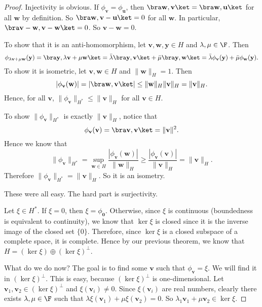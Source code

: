 \documentclass[a4paper]{article}
\begin{document}
\begin{proof}
  Injectivity is obvious. If $\phi_{\mathbf{v}} = \phi_{\mathbf{u}}$, then $\bra \mathbf{w}, \mathbf{v}\ket = \bra \mathbf{w}, \mathbf{u}\ket$ for all $\mathbf{w}$ by definition. So $\bra \mathbf{w}, \mathbf{v} - \mathbf{u}\ket = 0$ for all $\mathbf{w}$. In particular, $\bra \mathbf{v} - \mathbf{w}, \mathbf{v} - \mathbf{w}\ket = 0$. So $\mathbf{v} - \mathbf{w} = 0$.

  To show that it is an anti-homomorphism, let $\mathbf{v}, \mathbf{w}, \mathbf{y} \in H$ and $\lambda, \mu \in \F$. Then
  \[
    \phi_{\lambda\mathbf{v} + \mu \mathbf{w}}(\mathbf{y}) = \bra \mathbf{y}, \lambda \mathbf{v} + \mu \mathbf{w}\ket = \bar{\lambda} \bra \mathbf{y}, \mathbf{v}\ket + \bar{\mu}\bra \mathbf{y}, \mathbf{w}\ket = \bar{\lambda} \phi_{\mathbf{v}}(\mathbf{y}) + \bar{\mu} \phi_{\mathbf{w}} (\mathbf{y}).
  \]
  To show it is isometric, let $\mathbf{v}, \mathbf{w} \in H$ and $\|\mathbf{w}\|_H = 1$. Then
  \[
    |\phi_\mathbf{v}(\mathbf{w})| = |\bra \mathbf{w}, \mathbf{v}\ket| \leq \|\mathbf{w}\|_H \|\mathbf{v}\|_H = \|\mathbf{v}\|_H.
  \]
  Hence, for all $\mathbf{v}$, $\|\phi_\mathbf{v}\|_{H^*} \leq \|\mathbf{v}\|_H$ for all $\mathbf{v} \in H$.

  To show $\|\phi_\mathbf{v}\|_{H^*}$ is exactly $\|\mathbf{v}\|_H$, notice that
  \[
    \phi_\mathbf{v}(\mathbf{v}) = \bra \mathbf{v}, \mathbf{v}\ket = \|\mathbf{v}\|^2.
  \]
  Hence we know that
  \[
    \|\phi_\mathbf{v}\|_{H^*} = \sup_{\mathbf{w} \in H} \frac{|\phi_{\mathbf{v}}(\mathbf{w})|}{\|\mathbf{w}\|_H} \geq \frac{|\phi_{\mathbf{v}}(\mathbf{v})|}{\|\mathbf{v}\|_H} = \|\mathbf{v}\|_H.
  \]
  Therefore $\|\phi_{\mathbf{v}}\|_{H^*} = \|\mathbf{v}\|_H$. So it is an isometry.

  These were all easy. The hard part is surjectivity.

  Let $\xi \in H^*$. If $\xi = 0$, then $\xi = \phi_{\mathbf{0}}$. Otherwise, since $\xi$ is continuous (boundedness is equivalent to continuity), we know that $\ker \xi$ is closed since it is the inverse image of the closed set $\{0\}$. Therefore, since $\ker \xi$ is a closed subspace of a complete space, it is complete. Hence by our previous theorem, we know that $H = (\ker \xi) \oplus (\ker \xi)^\perp$.

  What do we do now? The goal is to find some $\mathbf{v}$ such that $\phi_{\mathbf{v}} = \xi$. We will find it in $(\ker \xi)^\perp$. This is easy, because $(\ker \xi)^\perp$ is one-dimensional. Let $\mathbf{v}_1, \mathbf{v}_2 \in (\ker \xi)^\perp$ and $\xi(\mathbf{v}_i) \not= 0$. Since $\xi(\mathbf{v}_i)$ are real numbers, clearly there exists $\lambda, \mu \in \F$ such that $\lambda \xi(\mathbf{v}_1) + \mu \xi(\mathbf{v}_2) = 0$. So $\lambda_1 \mathbf{v}_1 + \mu \mathbf{v}_2 \in \ker \xi$.


\end{proof}
\end{document}
